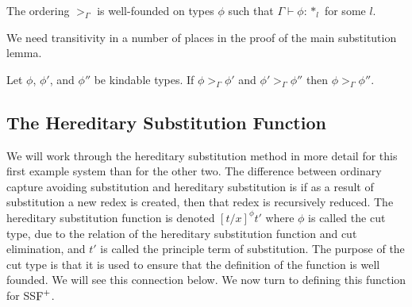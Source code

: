 
\begin{thm}
  The ordering $>_\Gamma$ is well-founded on types $\phi$ such that 
  $\Gamma \vdash \phi:*_l$ for some $l$.
  \label{thm:well-founded_ordering_ssfp}
\end{thm}

\noindent
We need transitivity in a number of places in the proof of the main
substitution lemma.  

\begin{lemma}
  Let $\phi$, $\phi'$, and $\phi''$ be kindable types.  If $\phi >_\Gamma \phi'$ and 
  $\phi' >_\Gamma \phi''$ then $\phi >_\Gamma \phi''$.
  \label{lemma:transitivity_ssfp}
\end{lemma}

\subsection{The Hereditary Substitution Function}
\label{sec:the_hereditary_substitution_function_ssfp}
We will work through the hereditary substitution method in more detail
for this first example system than for the other two.  The difference
between ordinary capture avoiding substitution and hereditary substitution
is if as a result of substitution a new redex is created, then
that redex is recursively reduced.  The hereditary substitution
function is denoted $[t/x]^\phi t'$ where $\phi$ is called the cut
type, due to the relation of the hereditary substitution function and
cut elimination, and $t'$ is called the principle term of
substitution.  The purpose of the cut type is that it is used to
ensure that the definition of the function is well founded.  We will
see this connection below.  We now turn to defining this function for
SS$\mbox{F}^{+}$.

